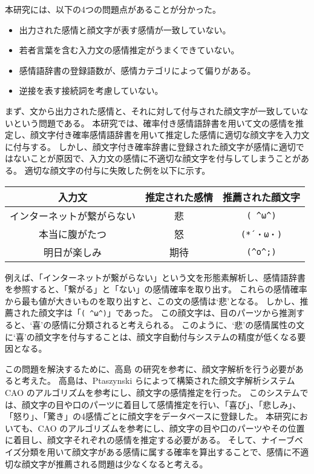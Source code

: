 \documentclass[11pt,a4j]{jsarticle}
\begin{document}
本研究には、以下の4つの問題点があることが分かった。

\begin{itemize}
  \item 出力された感情と顔文字が表す感情が一致していない。
  \item 若者言葉を含む入力文の感情推定がうまくできていない。
  \item 感情語辞書の登録語数が、感情カテゴリによって偏りがある。
  \item 逆接を表す接続詞を考慮していない。
  \end{itemize}

まず、文から出力された感情と、それに対して付与された顔文字が一致していないという問題である。
本研究では、確率付き感情語辞書を用いて文の感情を推定し、顔文字付き確率感情語辞書を用いて推定した感情に適切な顔文字を入力文に付与する。
しかし、顔文字付き確率辞書に登録された顔文字が感情に適切ではないことが原因で、入力文の感情に不適切な顔文字を付与してしまうことがある。
適切な顔文字の付与に失敗した例を以下に示す。

\begin{table}[htb]
  \centering
  \begin{tabular}{c||c|c} \hline
    入力文 & 推定された感情 & 推薦された顔文字 \\ \hline
    インターネットが繋がらない & 悲 & \verb|( ^ω^)| \\
    本当に腹がたつ & 怒 & \verb|(*´・ω・)|   \\
    明日が楽しみ & 期待 & \verb|(^o^;)| \\ \hline
  \end{tabular}
\end{table}

例えば、「インターネットが繋がらない」という文を形態素解析し、感情語辞書を参照すると、「繋がる」と「ない」の感情確率を取り出す。
これらの感情確率から最も値が大きいものを取り出すと、この文の感情は`悲'となる。
しかし、推薦された顔文字は「\verb|( ^ω^)|」であった。
この顔文字は、目のパーツから推測すると、`喜'の感情に分類されると考えられる。
このように、`悲'の感情属性の文に`喜'の顔文字を付与することは、顔文字自動付与システムの精度が低くなる要因となる。

この問題を解決するために、高島  の研究を参考に、顔文字解析を行う必要があると考えた。
高島は、Ptaszynski らによって構築された顔文字解析システム CAO のアルゴリズムを参考にし、顔文字の感情推定を行った。
このシステムでは、顔文字の目や口のパーツに着目して感情推定を行い、「喜び」、「悲しみ」、「怒り」、「驚き」の4感情ごとに顔文字をデータベースに登録した。
本研究においても、CAO のアルゴリズムを参考にし、顔文字の目や口のパーツやその位置に着目し、顔文字それぞれの感情を推定する必要がある。
そして、ナイーブベイズ分類を用いて顔文字がある感情に属する確率を算出することで、感情に不適切な顔文字が推薦される問題は少なくなると考える。
\end{document}
